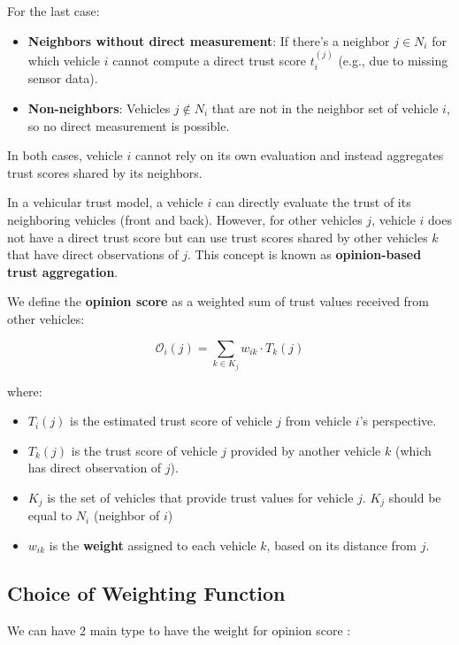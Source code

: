 \documentclass[letterpaper, 10pt, conference]{ieeeconf}  %
\begin{document}
\item For the last case:
    \begin{itemize}
        \item \textbf{Neighbors without direct measurement}: If there's a neighbor $j \in N_i$ for which vehicle $i$ cannot compute a direct trust score $t_i^{(j)}$ (e.g., due to missing sensor data).
        \item \textbf{Non-neighbors}: Vehicles $j \notin N_i$ that are not in the neighbor set of vehicle $i$, so no direct measurement is possible.
    \end{itemize}
In both cases, vehicle $i$ cannot rely on its own evaluation and instead aggregates trust scores shared by its neighbors.
    

In a vehicular trust model, a vehicle \( i \) can directly evaluate the trust of its neighboring vehicles (front and back). However, for other vehicles \( j \), vehicle \( i \) does not have a direct trust score but can use trust scores shared by other vehicles \( k \) that have direct observations of \( j \). This concept is known as \textbf{opinion-based trust aggregation}.

We define the \textbf{opinion score} as a weighted sum of trust values received from other vehicles:

\begin{equation}
\mathcal{O}_i(j) = \sum_{k \in K_j} w_{ik} \cdot T_k(j)    
\end{equation}

where:
\begin{itemize}
    \item \( T_i(j) \) is the estimated trust score of vehicle \( j \) from vehicle \( i \)'s perspective.
    \item \( T_k(j) \) is the trust score of vehicle \( j \) provided by another vehicle \( k \) (which has direct observation of \( j \)).
    \item \( K_j \) is the set of vehicles that provide trust values for vehicle \( j \). $K_j$ should be equal to $N_i$ (neighbor of $i$)
    \item \( w_{ik} \) is the \textbf{weight} assigned to each vehicle \( k \), based on its distance from \( j \).
\end{itemize}

\subsection{Choice of Weighting Function}
We can have 2 main type to have the weight for opinion score :  
\end{document}
